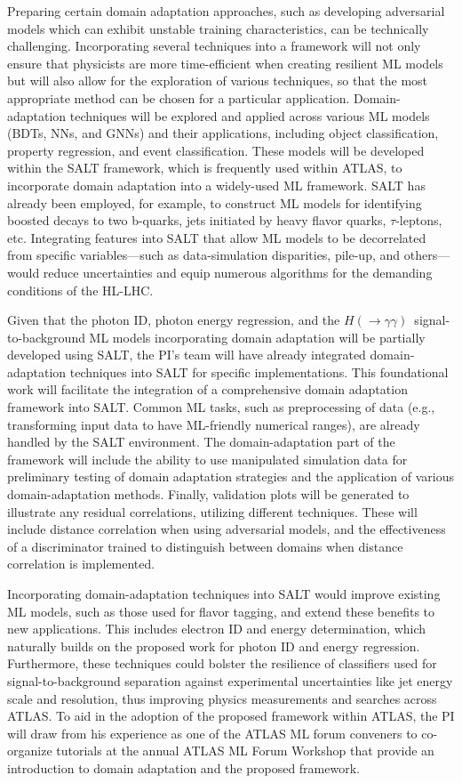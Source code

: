 \documentclass[letter, USenglish, 11pt, subfigure]{article}
\newcommand{\hyy}{\ensuremath{H(\to\gamma\gamma)}}
\begin{document}
Preparing certain domain adaptation approaches, such as developing adversarial models which can exhibit unstable training characteristics, can be technically challenging. Incorporating several techniques into a framework will not only ensure that physicists are more time-efficient when creating resilient ML models but will also allow for the exploration of various techniques, so that the most appropriate method can be chosen for a particular application. Domain-adaptation techniques will be explored and applied across various ML models (BDTs, NNs, and GNNs) and their applications, including object classification, property regression, and event classification. These models will be developed within the SALT framework, which is frequently used within ATLAS, to incorporate domain adaptation into a widely-used ML framework. SALT has already been employed, for example, to construct ML models for identifying boosted decays to two b-quarks, jets initiated by heavy flavor quarks, $\tau$-leptons, etc. Integrating features into SALT that allow ML models to be decorrelated from specific variables—such as data-simulation disparities, pile-up, and others—would reduce uncertainties and equip numerous algorithms for the demanding conditions of the HL-LHC.

Given that the photon ID, photon energy regression, and the \hyy\ signal-to-background ML models incorporating domain adaptation will be partially developed using SALT, the PI's team will have already integrated domain-adaptation techniques into SALT for specific implementations. This foundational work will facilitate the integration of a comprehensive domain adaptation framework into SALT. Common ML tasks, such as preprocessing of data (e.g., transforming input data to have ML-friendly numerical ranges), are already handled by the SALT environment. The domain-adaptation part of the framework will include the ability to use manipulated simulation data for preliminary testing of domain adaptation strategies and the application of various domain-adaptation methods. Finally, validation plots will be generated to illustrate any residual correlations, utilizing different techniques\cite{Shenoy_2023}. These will include distance correlation when using adversarial models, and the effectiveness of a discriminator trained to distinguish between domains when distance correlation is implemented.

Incorporating domain-adaptation techniques into SALT would improve existing ML models, such as those used for flavor tagging, and extend these benefits to new applications. This includes electron ID and energy determination, which naturally builds on the proposed work for photon ID and energy regression. Furthermore, these techniques could bolster the resilience of classifiers used for signal-to-background separation against experimental uncertainties like jet energy scale and resolution, thus improving physics measurements and searches across ATLAS. To aid in the adoption of the proposed framework within ATLAS, the PI will draw from his experience as one of the ATLAS ML forum conveners to co-organize tutorials at the annual ATLAS ML Forum Workshop that provide an introduction to domain adaptation and the proposed framework.
\end{document}
